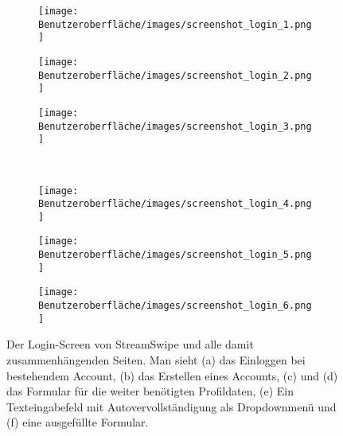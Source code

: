 \begin{figure}[tbt]
	\begin{subfigure}{0.33\textwidth}
	\centering
	\texttt{[image: Benutzeroberfläche/images/screenshot\_login\_1.png]}
	\caption{}
	\label{fig:login_a}
	\end{subfigure}
	\begin{subfigure}{0.33\textwidth}
	\centering
	\texttt{[image: Benutzeroberfläche/images/screenshot\_login\_2.png]}
	\caption{}
	\label{fig:login_b}
	\end{subfigure}
	\begin{subfigure}{0.33\textwidth}
	\centering
	\texttt{[image: Benutzeroberfläche/images/screenshot\_login\_3.png]}
	\caption{}
	\label{fig:login_c}
	\end{subfigure}\\ \vspace{1cm}	
	
	\begin{subfigure}{0.33\textwidth}
	\centering
	\texttt{[image: Benutzeroberfläche/images/screenshot\_login\_4.png]}
	\caption{}
	\label{fig:login_d}
	\end{subfigure}
	\begin{subfigure}{0.33\textwidth}
	\centering
	\texttt{[image: Benutzeroberfläche/images/screenshot\_login\_5.png]}
	\caption{}
	\label{fig:login_e}
	\end{subfigure}
	\begin{subfigure}{0.33\textwidth}
	\centering
	\texttt{[image: Benutzeroberfläche/images/screenshot\_login\_6.png]}
	\caption{}
	\label{fig:login_f}
	\end{subfigure}
\caption{Der Login-Screen von StreamSwipe und alle damit zusammenhängenden Seiten. Man sieht (a) das Einloggen bei bestehendem Account, (b) das Erstellen eines Accounts, (c) und (d) das Formular für die weiter benötigten Profildaten, (e) Ein Texteingabefeld mit Autovervollständigung als Dropdownmenü und (f) eine ausgefüllte Formular.}
\label{fig:login_alle}
\end{figure}
\clearpage
